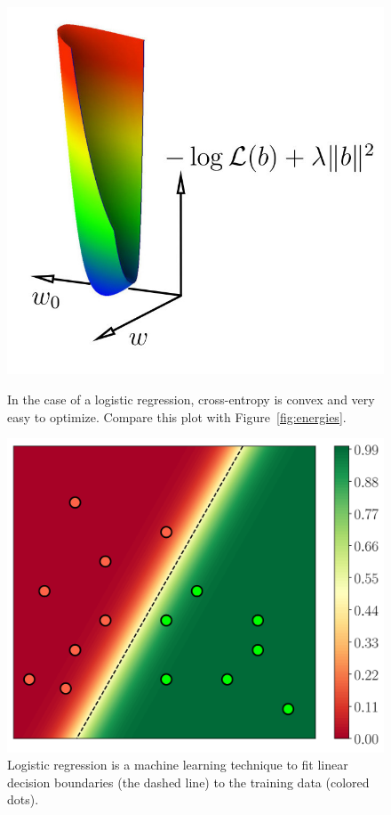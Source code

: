 \documentclass[notitlepage,oneside]{book}
\begin{document}
\begin{figure}[t]
\begin{minipage}{.45\linewidth}
    \centering
    \includegraphics[width=.7\linewidth]{img/ls-vs-crossentropy-energies2.jpg}
    \caption{In the case of a logistic regression, cross-entropy is convex and very easy to optimize. Compare this plot with Figure~\ref{fig:energies}.}
    \label{fig:energy}
\end{minipage}
\hspace{.05\linewidth}
\begin{minipage}{.45\linewidth}
    \centering
    \includegraphics[width=.8\linewidth]{img/logistic-regression-2d.png}
    \caption{Logistic regression is a machine learning technique to fit linear decision boundaries (the dashed line) to the training data (colored dots).}
    \label{fig:logistic2d}
\end{minipage}
\end{figure}
\end{document}
